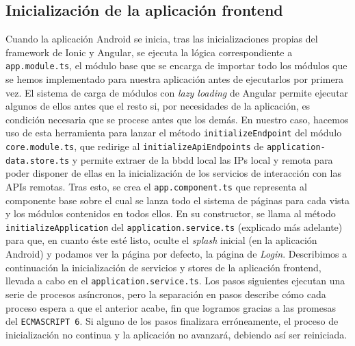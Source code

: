 \subsection{Inicialización de la aplicación frontend}
\label{ch:Capitulo4.7.4}

Cuando la aplicación Android se inicia, tras las inicializaciones propias del framework de Ionic y Angular, se ejecuta la lógica correspondiente a \verb|app.module.ts|, el módulo base que se encarga de importar todo los módulos que se hemos implementado para nuestra aplicación antes de ejecutarlos por primera vez. El sistema de carga de módulos con \textit{lazy loading} de Angular permite ejecutar algunos de ellos antes que el resto si, por necesidades de la aplicación, es condición necesaria que se procese antes que los demás. En nuestro caso, hacemos uso de esta herramienta para lanzar el método \verb|initializeEndpoint| del módulo \verb|core.module.ts|, que redirige al \verb|initializeApiEndpoints| de \verb|application-data.store.ts| y permite extraer de la \gls{bbdd} local las IPs local y remota para poder disponer de ellas en la inicialización de los servicios de interacción con las APIs remotas.
\vspace{0.5cm}
Tras esto, se crea el \verb|app.component.ts| que representa al componente base sobre el cual se lanza todo el sistema de páginas para cada vista y los módulos contenidos en todos ellos. En su constructor, se llama al método \verb|initializeApplication| del \verb|application.service.ts| (explicado más adelante) para que, en cuanto éste esté listo, oculte el \textit{splash} inicial (en la aplicación Android) y podamos ver la página por defecto, la página de \textit{Login}.
\vspace{0.5cm}
Describimos a continuación la inicialización de servicios y stores de la aplicación frontend, llevada a cabo en el \verb|application.service.ts|. Los pasos siguientes ejecutan una serie de procesos asíncronos, pero la separación en pasos describe cómo cada proceso espera a que el anterior acabe, fin que logramos gracias a las promesas del \verb|ECMASCRIPT 6|. Si alguno de los pasos finalizara erróneamente, el proceso de inicialización no continua y la aplicación no avanzará, debiendo así ser reiniciada.
